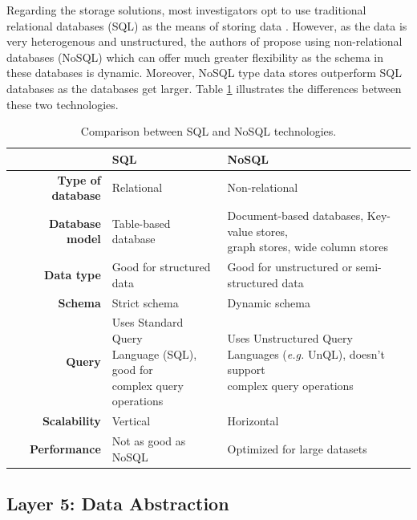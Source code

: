 Regarding the storage solutions, most investigators opt to use traditional relational databases (SQL) as the means of storing data \cite{Fuhrer2006, Wu2020, Catarinucci2015, Adame2018}. However, as the data is very heterogenous and unstructured, the authors of \cite{Subahi2019} propose using non-relational databases (NoSQL) which can offer much greater flexibility as the schema in these databases is dynamic. Moreover, NoSQL type data stores outperform SQL databases as the databases get larger. Table \ref{tab:comparsion-databasetech} illustrates the differences between these two technologies. 

\renewcommand{\arraystretch}{2}
\begin{table}[H]
    \centering
    \begin{tabular}{r|l|l}
        & \textbf{SQL}& \textbf{NoSQL}  \\ \hline
        \textbf{Type of database} & Relational & Non-relational \\
        \textbf{Database model} & Table-based database & \makecell{Document-based databases, Key-value stores, \\ graph stores, wide column stores} \\
        \textbf{Data type} & Good for structured data & Good for unstructured or semi-structured data \\
        \textbf{Schema} & Strict schema & Dynamic schema \\
        \textbf{Query} & \makecell{Uses Standard Query \\Language (SQL), good for \\ complex query operations} & \makecell{Uses Unstructured Query \\ Languages (\textit{e.g.} UnQL), doesn't support \\ complex query operations}  \\ 
        \textbf{Scalability} & Vertical & Horizontal \\
        \textbf{Performance} & Not as good as NoSQL & Optimized for large datasets \\
    \end{tabular}
    \caption{Comparison between SQL and NoSQL technologies.}
    \label{tab:comparsion-databasetech}
\end{table} 
\renewcommand{\arraystretch}{1}

\subsection{Layer 5: Data Abstraction}
\label{sec:iot-model-layer5}

